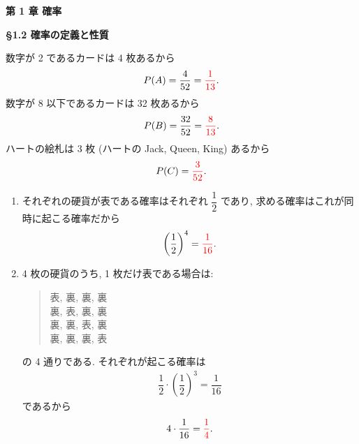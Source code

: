 {
	\centering
	{\textbf{第 1 章 \indent 確率}} \\
}

{\textbf{\S 1.2 \indent 確率の定義と性質}}

数字が 2 であるカードは 4 枚あるから
\begin{align}
	P(A) = \frac{4}{52} = \textcolor{red}{\frac{1}{13}}.
\end{align}
数字が 8 以下であるカードは 32 枚あるから
\begin{align}
	P(B) = \frac{32}{52} = \textcolor{red}{\frac{8}{13}}.
\end{align}
ハートの絵札は 3 枚 (ハートの Jack, Queen, King) あるから
\begin{align}
	P(C) = \textcolor{red}{\frac{3}{52}}.
\end{align}

\begin{enumerate}
	\item{
		それぞれの硬貨が表である確率はそれぞれ $\dfrac{1}{2}$ であり, 求める確率はこれが同時に起こる確率だから
		\begin{align}
			\left(\frac{1}{2}\right)^{4} = \textcolor{red}{\frac{1}{16}}.
		\end{align}
	}
	\item{
		4 枚の硬貨のうち, 1 枚だけ表である場合は: 
		\begin{quote}
			表, 裏, 裏, 裏 \\
			裏, 表, 裏, 裏 \\
			裏, 裏, 表, 裏 \\
			裏, 裏, 裏, 表
		\end{quote}
		の 4 通りである.
		それぞれが起こる確率は
		\begin{align}
			\dfrac{1}{2}\cdot\left(\dfrac{1}{2}\right)^{3} = \dfrac{1}{16}
		\end{align}
		であるから
		\begin{align}
			4\cdot\dfrac{1}{16} = \textcolor{red}{\dfrac{1}{4}}.
		\end{align}
	}
\end{enumerate}

